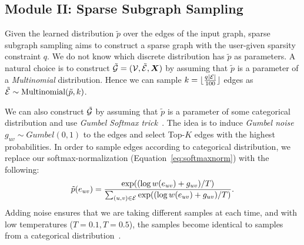 
\subsection{Module II: Sparse Subgraph Sampling}
Given the learned distribution $\tilde{p}$ over the edges of the input graph, sparse subgraph sampling aims to construct a sparse graph with the user-given sparsity constraint $q$. We do not know which discrete distribution has $\tilde{p}$ as parameters. A natural choice is to construct $\tilde{{\mathcal{G}}} = ({\mathcal{V}},\tilde{{\mathcal{E}}},{\bm{X}})$ by assuming that $\tilde{p}$ is a parameter of a \emph{Multinomial} distribution. Hence we can sample $k=\lfloor \frac{q|{\mathcal{E}}|}{100} \rfloor$ edges as
$\tilde{{\mathcal{E}}} \sim \text{Multinomial}(\tilde{p},k)$.

We can also construct $\tilde{{\mathcal{G}}}$ by assuming that $\tilde{p}$ is a parameter of some categorical distribution and use \emph{Gumbel Softmax trick}~\cite{jang2016categorical}. The idea is to induce \emph{Gumbel noise} $g_{uv}\sim Gumbel(0,1)$ to the edges and select Top-$K$ edges with the highest probabilities.
In order to sample edges according to categorical distribution, we replace our softmax-normalization (Equation~\ref{eq:softmaxnorm}) with the following:
\begin{equation}
\tilde{p}(e_{uv}) = \frac{\exp(({\log w(e_{uv})+g_{uv}})/{T})}{\sum_{(u,v)\in {\mathcal{E}}} \exp({(\log w(e_{uv})+g_{uv})}/{T
})}.    
\end{equation}
Adding noise ensures that we are taking different samples at each time, and with low temperatures ($T=0.1, T=0.5$), the samples become identical to samples from a categorical distribution~\cite{jang2016categorical}. 

